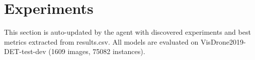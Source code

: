 \section{Experiments}
This section is auto-updated by the agent with discovered experiments and best metrics extracted from results.csv. All models are evaluated on VisDrone2019-DET-test-dev (1609 images, 75082 instances).

